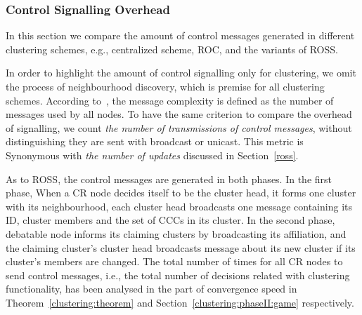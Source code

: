 \documentclass[10pt,journal,compsoc]{IEEEtran}
\theoremstyle{mytheoremstyle}
\theoremstyle{mytheoremstyle}
\theoremstyle{mytheoremstyle}
\newcommand{\eg}{e.g., }
\newcommand{\ie}{i.e., }
\begin{document}
\subsubsection{Control Signalling Overhead}

In this section we compare the amount of control messages generated in different clustering schemes, \eg centralized scheme, ROC, and the variants of ROSS.

In order to highlight the amount of control signalling only for clustering, we omit the process of neighbourhood discovery, which is premise for all clustering schemes.
According to~\cite{complexity_aggregation_2011}, the message complexity is defined as the number of messages used by all nodes.
To have the same criterion to compare the overhead of signalling, we count \textit{the number of transmissions of control messages}, without distinguishing they are sent with broadcast or unicast.
This metric is Synonymous with \textit{the number of updates} discussed in Section~\ref{ross}.

As to ROSS, the control messages are generated in both phases.
In the first phase, %
When a CR node decides itself to be the cluster head, it forms one cluster with its neighbourhood, 
each cluster head broadcasts one message containing its ID, cluster members and the set of CCCs in its cluster.
In the second phase, %
debatable node informs its claiming clusters by broadcasting its affiliation, and the claiming cluster's cluster head broadcasts message about its new cluster if its cluster's members are changed.
The total number of times for all CR nodes to send control messages, \ie the total number of decisions related with clustering functionality, has been analysed in the part of convergence speed in Theorem~\ref{clustering:theorem} and Section~\ref{clustering:phaseII:game} respectively.
\end{document}
